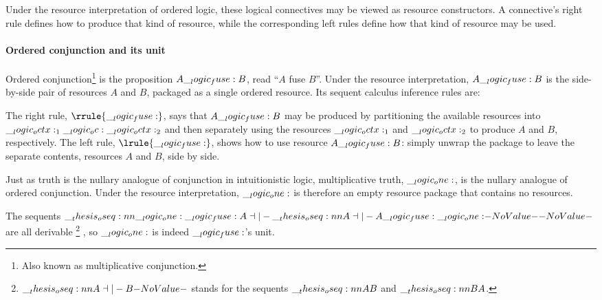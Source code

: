 Under the resource interpretation of ordered logic, these logical connectives may be viewed as resource constructors.
A connective's right rule defines how to produce that kind of resource, while the corresponding left rules define how that kind of resource may be used.

\paragraph*{Ordered conjunction and its unit}\label{p:ordered-logic:ordered-conjunction}
Ordered conjunction\footnote{Also known as multiplicative conjunction.} is the proposition $A \__logic_fuse: B$, read \enquote{$A$ fuse $B$}.
Under the resource interpretation, $A \__logic_fuse: B$ is the side-by-side pair of resources $A$ and $B$, packaged as a single ordered resource.
Its sequent calculus inference rules are:
The right rule, $\rrule{\fuse}$, says that $A \__logic_fuse: B$ may be produced by partitioning the available resources into $\__logic_octx:_1 \__logic_oc: \__logic_octx:_2$ and then separately using the resources $\__logic_octx:_1$ and $\__logic_octx:_2$ to produce $A$ and $B$, respectively.
The left rule, $\lrule{\fuse}$, shows how to use resource $A \__logic_fuse: B$: simply unwrap the package to leave the separate contents, resources $A$ and $B$, side by side.

Just as truth is the nullary analogue of conjunction in intuitionistic logic, multiplicative truth, $\__logic_one:$, is the nullary analogue of ordered conjunction.
Under the resource interpretation, $\__logic_one:$ is therefore an empty resource package that contains no resources.
The sequents $\oseq{\one \fuse A \dashv|- \oseq{A \dashv|- A \fuse \one}}$ are all derivable%
\footnote{$\oseq{A \dashv|- B}$ stands for the sequents $\oseq{A |- B}$ and $\oseq{B |- A}$.}%
, so $\__logic_one:$ is indeed $\__logic_fuse:$'s unit.%

